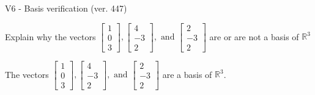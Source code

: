 \begin{exercise}
  \begin{exerciseTitle}V6 - Basis verification (ver. 447)\end{exerciseTitle}
  \begin{exerciseStatement}
    Explain why the vectors \(\left[\begin{array}{r}
1 \\
0 \\
3
\end{array}\right] , \left[\begin{array}{r}
4 \\
-3 \\
2
\end{array}\right] , \text{ and } \left[\begin{array}{r}
2 \\
-3 \\
2
\end{array}\right]\) are or are not a basis of \(\mathbb{R}^3\)	


  \end{exerciseStatement}
  \begin{exerciseAnswer}
   The vectors \(\left[\begin{array}{r}
1 \\
0 \\
3
\end{array}\right] , \left[\begin{array}{r}
4 \\
-3 \\
2
\end{array}\right] , \text{ and } \left[\begin{array}{r}
2 \\
-3 \\
2
\end{array}\right]\) 
  	 are  a basis of \(\mathbb{R}^3\).
  


  \end{exerciseAnswer}
\end{exercise}